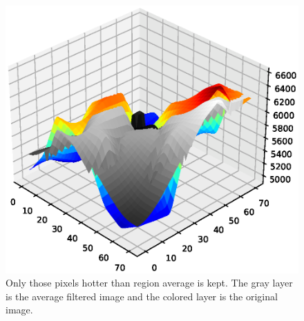 \begin{figure}
  \centering
  \includegraphics[width=\textwidth]{figures/detect_filterthres.eps}
  \caption{Only those pixels hotter than region average is kept. The gray layer is the average filtered image and the colored layer is the original image.}\label{fig:detection3d}
\end{figure}

